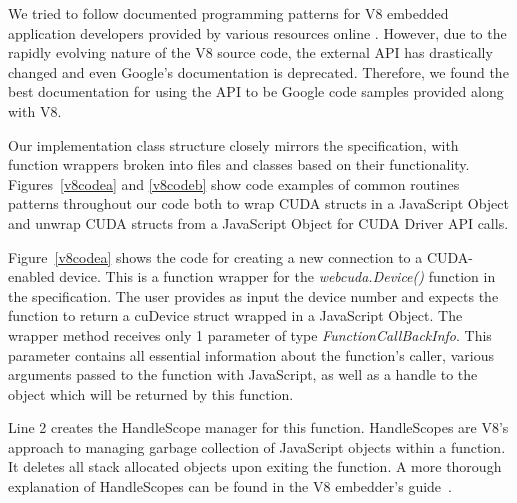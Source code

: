 We tried to follow documented programming patterns for V8 embedded application
developers provided by various resources online \cite{embeddersGuide,
nodeJSDocumentation}. However, due to the rapidly evolving nature of the V8
source code, the external API has drastically changed and even Google's
documentation \cite{embeddersGuide} is deprecated. Therefore, we found the best
documentation for using the API to be Google code samples provided along with
V8.

\begin{figure*}
	\begin{center}
		\small
		
\end{center}
\caption{Creating new \name Device Object}
\label{v8codea}
	\begin{center}
		\small
		
\end{center}
\caption{C++ Implementation of \namens's \textit{webcuda.free()} method}
\label{v8codeb}

\end{figure*}

Our implementation class structure closely mirrors the specification, with
function wrappers broken into files and classes based on their functionality.
Figures~\ref{v8codea} and \ref{v8codeb} show code examples of common routines
patterns throughout our code both to wrap CUDA structs in a
JavaScript Object and unwrap CUDA structs from a JavaScript Object for CUDA
Driver API calls.  

Figure~\ref{v8codea} shows the code for creating a new connection to a
CUDA-enabled device. This is a function wrapper for the \textit{webcuda.Device()}
function in the \name specification. The user provides as input the device
number and expects the function to return a cuDevice struct wrapped in a
JavaScript Object.  The wrapper method receives only 1 parameter of type
\textit{FunctionCallBackInfo}. This parameter contains all essential information
about the function's caller, various arguments passed to the function with
JavaScript, as well as a handle to the object which will be returned by this
function. 

Line 2 creates the HandleScope manager for this function.  HandleScopes are V8's
approach to managing garbage collection of JavaScript objects within a function. It
deletes all stack allocated objects upon exiting the function.  A more
thorough explanation of HandleScopes can be found in the V8 embedder's
guide~\cite{embeddersGuide}.  

